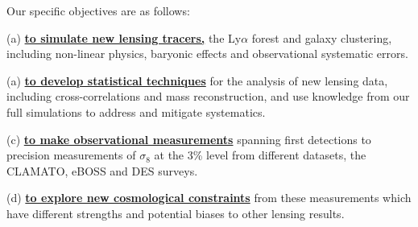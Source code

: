 Our specific objectives are as follows:

(a) {\bf \underline{to simulate new lensing tracers,}} the Ly$\alpha$ forest and galaxy clustering,
 including non-linear physics, baryonic effects and observational
systematic errors.

(a) {\bf \underline{to develop statistical techniques}} for the analysis of new lensing data, including 
cross-correlations and mass reconstruction, and use knowledge from our full simulations to address and mitigate systematics.


(c) {\bf \underline{to make observational measurements}} spanning first 
detections to precision measurements of $\sigma_{8}$ at the 3\% level 
from different datasets, the CLAMATO, eBOSS and DES surveys.

(d) {\bf \underline{to explore new cosmological constraints}} from these
measurements which have different strengths and potential biases  to other
lensing results.

